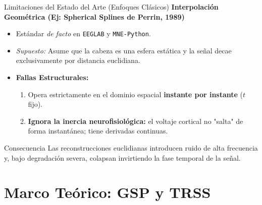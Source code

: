\documentclass[10pt, aspectratio=169]{beamer}
\begin{document}
\begin{frame}{Limitaciones del Estado del Arte (Enfoques Clásicos)}
    \textbf{Interpolación Geométrica (Ej: Spherical Splines de Perrin, 1989)}
    \begin{itemize}
        \item Estándar \textit{de facto} en \texttt{EEGLAB} y \texttt{MNE-Python}.
        \item \textit{Supuesto:} Asume que la cabeza es una esfera estática y la señal decae exclusivamente por distancia euclidiana.
        \item \textbf{Fallas Estructurales:}
        \begin{enumerate}
            \item Opera estrictamente en el dominio espacial \textbf{instante por instante} ($t$ fijo).
            \item \textbf{Ignora la inercia neurofisiológica:} el voltaje cortical no "salta" de forma instantánea; tiene derivadas continuas.
        \end{enumerate}
    \end{itemize}
    
    \vspace{0.3cm}
    \begin{block}{Consecuencia}
        Las reconstrucciones euclidianas introducen ruido de alta frecuencia y, bajo degradación severa, colapsan invirtiendo la fase temporal de la señal.
    \end{block}
\end{frame}

\section{Marco Teórico: GSP y TRSS}
\end{document}
